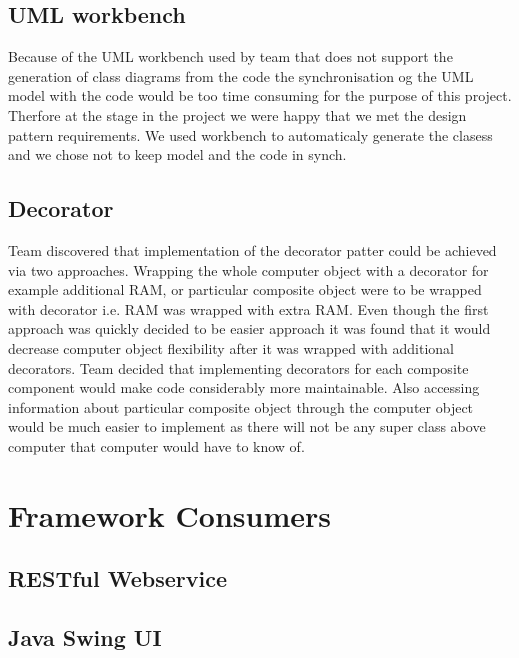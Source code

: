 \documentclass[pdftex,11pt,a4paper]{article}
\begin{document}
\subsection{UML workbench}
Because of the UML workbench used by team that does not support the generation of class diagrams from the code the synchronisation og the UML model with the code would be too time consuming for the purpose of this project. Therfore at the stage in the project we were happy that we met the design pattern requirements. We used workbench to automaticaly generate the clasess and we chose not to keep model and the code in synch.

\subsection{Decorator}

Team discovered that implementation of the decorator patter could be achieved via two approaches. Wrapping the whole computer object with a decorator for example additional RAM, or particular composite object were to be wrapped with decorator i.e. RAM was wrapped with extra RAM. Even though the first approach was quickly decided to be easier approach it was found that it would decrease computer object flexibility after it was wrapped with additional decorators. Team decided that implementing decorators for each composite component would make code considerably more maintainable. Also accessing information about particular composite object through the computer object would be much easier to implement as there will not be any super class above computer that computer would have to know of.


\section{Framework Consumers}

\subsection{RESTful Webservice}

\subsection{Java Swing UI}

\pagebreak



\def\refname{}


\end{document}
